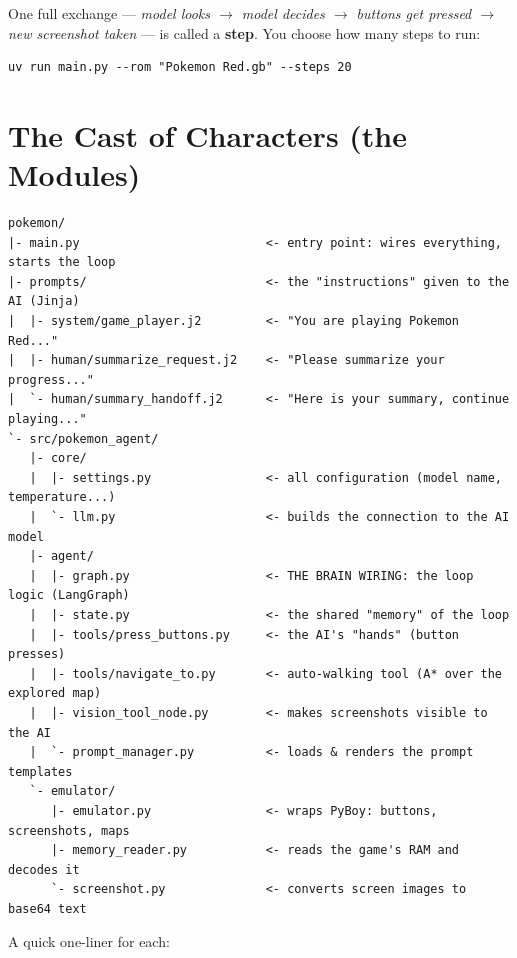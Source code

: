 \documentclass[11pt]{article}
\begin{document}
One full exchange --- \emph{model looks $\rightarrow$ model decides $\rightarrow$ buttons get pressed $\rightarrow$ new screenshot taken} --- is called a \textbf{step}. You choose how many steps to run:

\begin{verbatim}
uv run main.py --rom "Pokemon Red.gb" --steps 20
\end{verbatim}

\section{The Cast of Characters (the Modules)}

\begin{verbatim}
pokemon/
|- main.py                          <- entry point: wires everything, starts the loop
|- prompts/                         <- the "instructions" given to the AI (Jinja)
|  |- system/game_player.j2         <- "You are playing Pokemon Red..."
|  |- human/summarize_request.j2    <- "Please summarize your progress..."
|  `- human/summary_handoff.j2      <- "Here is your summary, continue playing..."
`- src/pokemon_agent/
   |- core/
   |  |- settings.py                <- all configuration (model name, temperature...)
   |  `- llm.py                     <- builds the connection to the AI model
   |- agent/
   |  |- graph.py                   <- THE BRAIN WIRING: the loop logic (LangGraph)
   |  |- state.py                   <- the shared "memory" of the loop
   |  |- tools/press_buttons.py     <- the AI's "hands" (button presses)
   |  |- tools/navigate_to.py       <- auto-walking tool (A* over the explored map)
   |  |- vision_tool_node.py        <- makes screenshots visible to the AI
   |  `- prompt_manager.py          <- loads & renders the prompt templates
   `- emulator/
      |- emulator.py                <- wraps PyBoy: buttons, screenshots, maps
      |- memory_reader.py           <- reads the game's RAM and decodes it
      `- screenshot.py              <- converts screen images to base64 text
\end{verbatim}

A quick one-liner for each:
\end{document}
